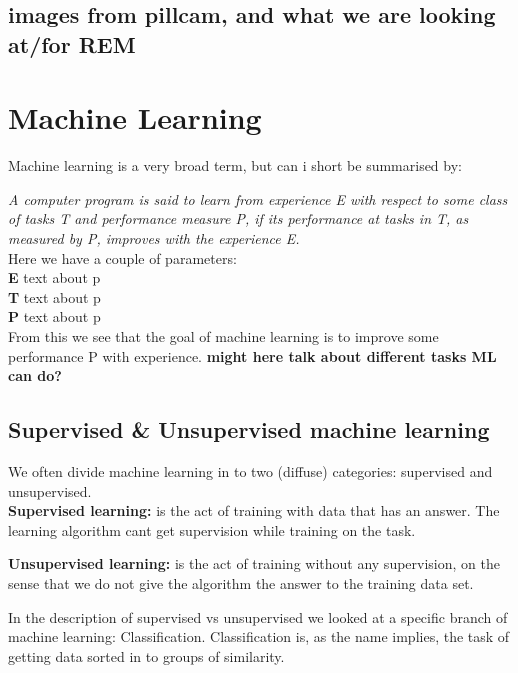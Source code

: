 \documentclass[a4paper,english]{ifimaster}
\begin{document}
	  \subsection{images from pillcam, and what we are looking at/for REM}
	  
	  
	\section{Machine Learning}
	Machine learning is a very broad term, but can i short be summarised by:\\
	\vspace{10px}
	
	\textit{ A computer program is said to learn from experience E with respect to 
	some class of tasks T and performance measure P, if its performance at
	tasks in T, as measured by P, improves with the experience E. } 
	\cite{MitchellTomM1997Ml}\\
	
	\vspace{10px}
	Here we have a couple of parameters:\\
	\textbf{E} text about p\\
	\textbf{T} text about p\\
	\textbf{P} text about p\\
	
	From this we see that the goal of machine learning is to improve some performance P with experience.
	\textbf{might here talk about different tasks ML can do?}
	
	  \subsection{Supervised \& Unsupervised machine learning}
	  We often divide machine learning in to two (diffuse) categories: supervised and unsupervised.\\
	  \textbf{Supervised learning:} is the act of training with data that has an answer. The learning algorithm cant get supervision while 
	  training on the task. %
	  
	  \textbf{Unsupervised learning:} is the act of training without any supervision, on the sense that we do not give the algorithm the answer
	  to the training data set. %
	  
	  In the description of supervised vs unsupervised we looked at a specific branch of machine learning: Classification. Classification is, as the name implies, the task of 
	  getting data sorted in to groups of similarity. 
	  
\end{document}
